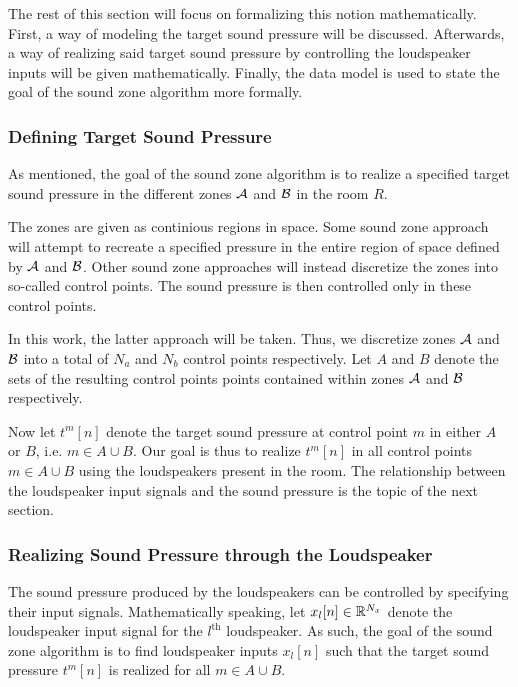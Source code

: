 The rest of this section will focus on formalizing this notion mathematically.
First, a way of modeling the target sound pressure will be discussed.
Afterwards, a way of realizing said target sound pressure by controlling the loudspeaker inputs will be given mathematically.
Finally, the data model is used to state the goal of the sound zone algorithm more formally.

\subsubsection{Defining Target Sound Pressure}
As mentioned, the goal of the sound zone algorithm is to realize a specified target sound pressure
in the different zones $\mathcal{A}$ and $\mathcal{B}$ in the room $R$.

The zones are given as continious regions in space.
Some sound zone approach will attempt to recreate a specified pressure in the entire region of space defined by $\mathcal{A}$ and $\mathcal{B}$.
Other sound zone approaches will instead discretize the zones into so-called control points.
The sound pressure is then controlled only in these control points.

In this work, the latter approach will be taken.
Thus, we discretize zones $\mathcal{A}$ and $\mathcal{B}$ into a total of $N_a$ and $N_b$ control points respectively.   
Let $A$ and $B$ denote the sets of the resulting control points points contained within zones $\mathcal{A}$ and $\mathcal{B}$ respectively.


Now let $t^{m}[n]$ denote the target sound pressure at control point $m$ in either $A$ or $B$, i.e. $m\in A \cup B$.
Our goal is thus to realize $t^{m}[n]$ in all control points $m\in A \cup B$ using the loudspeakers present in the room.
The relationship between the loudspeaker input signals and the sound pressure is the topic of the next section.

\subsubsection{Realizing Sound Pressure through the Loudspeaker}
The sound pressure produced by the loudspeakers can be controlled by specifying their input signals.
Mathematically speaking, let $x_l[n]\in\mathbb{R}^{N_x}$ denote the loudspeaker input signal for the $l^\text{th}$ loudspeaker.
As such, the goal of the sound zone algorithm is to find loudspeaker inputs $x_l[n]$ 
such that the target sound pressure $t^{m}[n]$ is realized for all $m\in A \cup B$.

